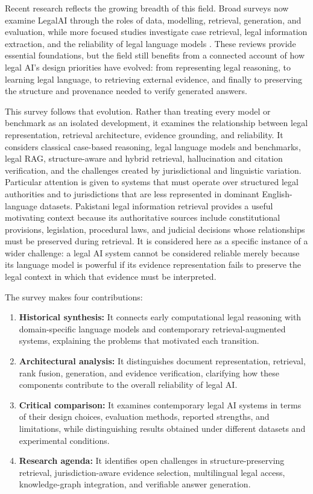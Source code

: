 Recent research reflects the growing breadth of this field. Broad surveys now examine LegalAI
through the roles of data, modelling, retrieval, generation, and evaluation, while more focused
studies investigate case retrieval, legal information extraction, and the reliability of legal
language models \citep{feng2024, premasiri2025, kelsall2025, chi2026}. These reviews provide
essential foundations, but the field still benefits from a connected account of how legal AI's
design priorities have evolved: from representing legal reasoning, to learning legal language, to
retrieving external evidence, and finally to preserving the structure and provenance needed to
verify generated answers.

This survey follows that evolution. Rather than treating every model or benchmark as an isolated
development, it examines the relationship between legal representation, retrieval architecture,
evidence grounding, and reliability. It considers classical case-based reasoning, legal language
models and benchmarks, legal RAG, structure-aware and hybrid retrieval, hallucination and
citation verification, and the challenges created by jurisdictional and linguistic variation.
Particular attention is given to systems that must operate over structured legal authorities and
to jurisdictions that are less represented in dominant English-language datasets. Pakistani legal
information retrieval provides a useful motivating context because its authoritative sources
include constitutional provisions, legislation, procedural laws, and judicial decisions whose
relationships must be preserved during retrieval. It is considered here as a specific instance of
a wider challenge: a legal AI system cannot be considered reliable merely because its language
model is powerful if its evidence representation fails to preserve the legal context in which that
evidence must be interpreted.

The survey makes four contributions:
\begin{enumerate}[leftmargin=1.4em, itemsep=2pt, topsep=2pt]
\item \textbf{Historical synthesis:} It connects early computational legal reasoning with
domain-specific language models and contemporary retrieval-augmented systems, explaining the
problems that motivated each transition.
\item \textbf{Architectural analysis:} It distinguishes document representation, retrieval, rank
fusion, generation, and evidence verification, clarifying how these components contribute to the
overall reliability of legal AI.
\item \textbf{Critical comparison:} It examines contemporary legal AI systems in terms of their
design choices, evaluation methods, reported strengths, and limitations, while distinguishing
results obtained under different datasets and experimental conditions.
\item \textbf{Research agenda:} It identifies open challenges in structure-preserving retrieval,
jurisdiction-aware evidence selection, multilingual legal access, knowledge-graph integration, and
verifiable answer generation.
\end{enumerate}

